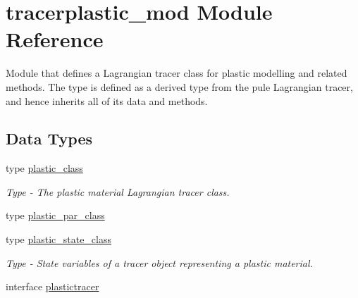 \hypertarget{namespacetracerplastic__mod}{}\section{tracerplastic\+\_\+mod Module Reference}
\label{namespacetracerplastic__mod}


Module that defines a Lagrangian tracer class for plastic modelling and related methods. The type is defined as a derived type from the pule Lagrangian tracer, and hence inherits all of it\textquotesingle{}s data and methods.  


\subsection*{Data Types}
\begin{DoxyCompactItemize}
\item 
type \mbox{\hyperlink{structtracerplastic__mod_1_1plastic__class}{plastic\+\_\+class}}
\begin{DoxyCompactList}\small\item\em Type -\/ The plastic material Lagrangian tracer class. \end{DoxyCompactList}\item 
type \mbox{\hyperlink{structtracerplastic__mod_1_1plastic__par__class}{plastic\+\_\+par\+\_\+class}}
\item 
type \mbox{\hyperlink{structtracerplastic__mod_1_1plastic__state__class}{plastic\+\_\+state\+\_\+class}}
\begin{DoxyCompactList}\small\item\em Type -\/ State variables of a tracer object representing a plastic material. \end{DoxyCompactList}\item 
interface \mbox{\hyperlink{interfacetracerplastic__mod_1_1plastictracer}{plastictracer}}
\end{DoxyCompactItemize}
